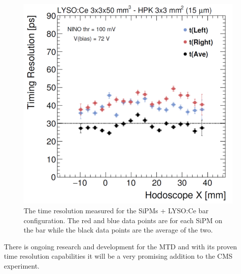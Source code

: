 \begin{figure}[h]
	\centering
	\includegraphics[width=0.7\linewidth]{Figures/testbeamtimeres}
	\caption[Time resolution measured as a function of the impact point along the LYSO:Ce bar.]{The time resolution measured for the SiPMs + LYSO:Ce bar configuration.  The red and blue data points are for each SiPM on the bar while the black data points are the average of the two.}
	\label{fig:testbeamtimeres}
\end{figure}
There is ongoing research and development for the MTD and with its proven time resolution capabilities it will be a very promising addition to the CMS experiment.












